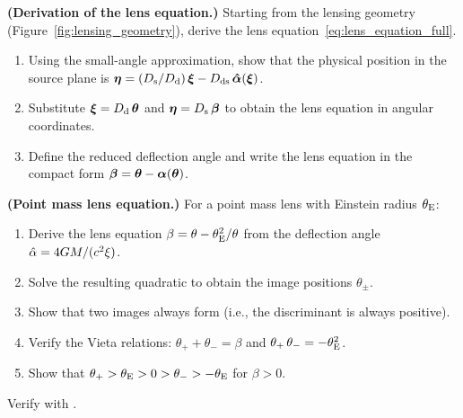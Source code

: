 \begin{exercise}
\label{ex:derive_lens_eq}
\textbf{(Derivation of the lens equation.)}
Starting from the lensing geometry (Figure~\ref{fig:lensing_geometry}),
derive the lens equation~\eqref{eq:lens_equation_full}.
\begin{enumerate}[label=(\alph*)]
    \item Using the small-angle approximation, show that the physical
          position in the source plane is
          $\boldsymbol{\eta} = (D_{\mathrm{s}}/D_{\mathrm{d}})\,\boldsymbol{\xi} - D_{\mathrm{ds}}\,\boldsymbol{\hat{\alpha}}(\boldsymbol{\xi})$.
    \item Substitute $\boldsymbol{\xi} = D_{\mathrm{d}}\,\boldsymbol{\theta}$ and
          $\boldsymbol{\eta} = D_{\mathrm{s}}\,\boldsymbol{\beta}$ to obtain the lens equation in
          angular coordinates.
    \item Define the reduced deflection angle and write the lens equation
          in the compact form $\boldsymbol{\beta} = \boldsymbol{\theta} - \boldsymbol{\alpha}(\boldsymbol{\theta})$.
\end{enumerate}
\end{exercise}

\begin{exercise}
\label{ex:point_mass_solve}
\textbf{(Point mass lens equation.)}
For a point mass lens with Einstein radius $\theta_{\mathrm{E}}$:
\begin{enumerate}[label=(\alph*)]
    \item Derive the lens equation $\beta = \theta - \theta_{\mathrm{E}}^2/\theta$
          from the deflection angle $\hat{\alpha} = 4G M /
          (c^2 \xi)$.
    \item Solve the resulting quadratic to obtain the image positions
          $\theta_\pm$.
    \item Show that two images always form (i.e., the discriminant is
          always positive).
    \item Verify the Vieta relations: $\theta_+ + \theta_- = \beta$
          and $\theta_+\,\theta_- = -\theta_{\mathrm{E}}^2$.
    \item Show that $\theta_+ > \theta_{\mathrm{E}} > 0 > \theta_- > -\theta_{\mathrm{E}}$
          for $\beta > 0$.
\end{enumerate}
Verify with
.
\end{exercise}

